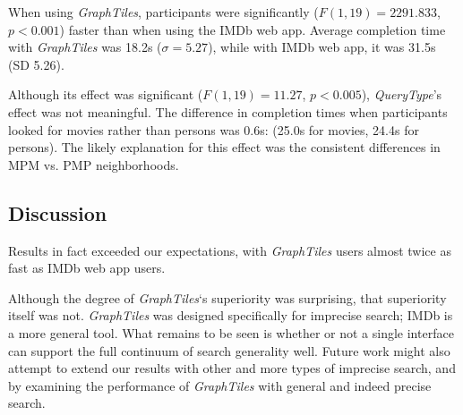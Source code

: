 When using \textit{GraphTiles}, participants were significantly ($F(1,19)=2291.833$, $p<0.001$) faster than when using the IMDb web app. Average completion time with \textit{GraphTiles} was 18.2s ($\sigma =5.27$), while with IMDb web app, it was 31.5s (SD 5.26).

Although its effect was significant ($F(1,19)=11.27$, $p<0.005$), \textit{QueryType}'s effect was not meaningful. The difference in completion times when participants looked for movies rather than persons was 0.6s: (25.0s for movies, 24.4s for persons). The likely explanation for this effect was the consistent differences in MPM vs. PMP neighborhoods.


\subsection{Discussion}

Results in fact exceeded our expectations, with \textit{GraphTiles} users almost twice as fast as IMDb web app users. 

Although the degree of \textit{GraphTiles}`s superiority was surprising, that superiority itself was not. \textit{GraphTiles} was designed specifically for imprecise search; IMDb is a more general tool. What remains to be seen is whether or not a single interface can support the full continuum of search generality well. Future work might also attempt to extend our results with other and more types of imprecise search, and by examining the performance of \textit{GraphTiles} with general and indeed precise search.
